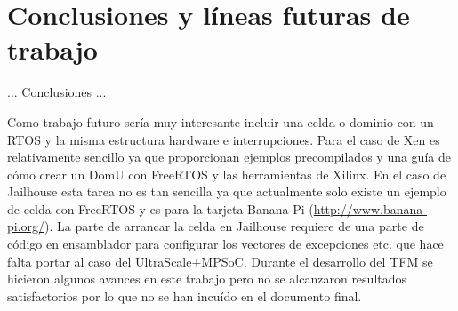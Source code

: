 \chapter{Conclusiones y líneas futuras de trabajo}

... Conclusiones ...

Como trabajo futuro sería muy interesante incluir una celda o dominio con un \acrshort{RTOS} y la misma estructura hardware e interrupciones. Para el caso de Xen es relativamente sencillo ya que proporcionan ejemplos precompilados y una guía de cómo crear un DomU con FreeRTOS y las herramientas de Xilinx. En el caso de Jailhouse esta tarea no es tan sencilla ya que actualmente solo existe un ejemplo de celda con FreeRTOS y es para la tarjeta Banana Pi (\url{http://www.banana-pi.org/}). La parte de arrancar la celda en Jailhouse requiere de una parte de código en ensamblador para configurar los vectores de excepciones etc. que hace falta portar al caso del UltraScale+\texttrademark MPSoC. Durante el desarrollo del TFM se hicieron algunos avances en este trabajo pero no se alcanzaron resultados satisfactorios por lo que no se han incuído en el documento final.
